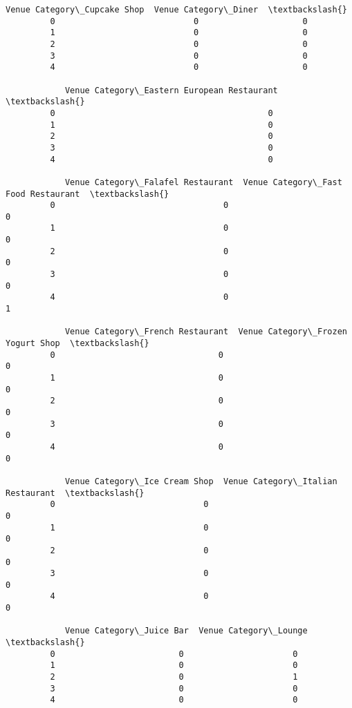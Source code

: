 \documentclass[11pt]{article}
\begin{document}
\begin{Verbatim}[commandchars=\\\{\}]
            Venue Category\_Cupcake Shop  Venue Category\_Diner  \textbackslash{}
         0                            0                     0   
         1                            0                     0   
         2                            0                     0   
         3                            0                     0   
         4                            0                     0   
         
            Venue Category\_Eastern European Restaurant  \textbackslash{}
         0                                           0   
         1                                           0   
         2                                           0   
         3                                           0   
         4                                           0   
         
            Venue Category\_Falafel Restaurant  Venue Category\_Fast Food Restaurant  \textbackslash{}
         0                                  0                                    0   
         1                                  0                                    0   
         2                                  0                                    0   
         3                                  0                                    0   
         4                                  0                                    1   
         
            Venue Category\_French Restaurant  Venue Category\_Frozen Yogurt Shop  \textbackslash{}
         0                                 0                                  0   
         1                                 0                                  0   
         2                                 0                                  0   
         3                                 0                                  0   
         4                                 0                                  0   
         
            Venue Category\_Ice Cream Shop  Venue Category\_Italian Restaurant  \textbackslash{}
         0                              0                                  0   
         1                              0                                  0   
         2                              0                                  0   
         3                              0                                  0   
         4                              0                                  0   
         
            Venue Category\_Juice Bar  Venue Category\_Lounge  \textbackslash{}
         0                         0                      0   
         1                         0                      0   
         2                         0                      1   
         3                         0                      0   
         4                         0                      0   
         

\end{Verbatim}
\end{document}

